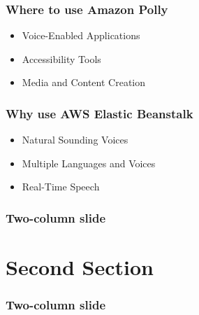 \documentclass{beamer}
\begin{document}
\begin{frame}
	\frametitle{Where to use Amazon Polly}
	\begin{block}{}
		\begin{itemize}
			\vspace{1ex}
			\item Voice-Enabled Applications \vspace{1ex}
			\item Accessibility Tools \vspace{1ex}
			\item Media and Content Creation \vspace{1ex}
		\end{itemize}
	\end{block}		
\end{frame}

\begin{frame}
	\frametitle{Why use AWS Elastic Beanstalk}	
	\begin{block}{}
		\begin{itemize}
			\vspace{1ex}
			\item Natural Sounding Voices \vspace{1ex}
			\item Multiple Languages and Voices \vspace{1ex}
			\item Real-Time Speech \vspace{1ex}
		\end{itemize}
	\end{block}
	
\end{frame}


\begin{frame}
	\frametitle{Two-column slide}	
\end{frame}


\section{Second Section}

\begin{frame}
	\frametitle{Two-column slide}
	
\end{frame}
\end{document}
